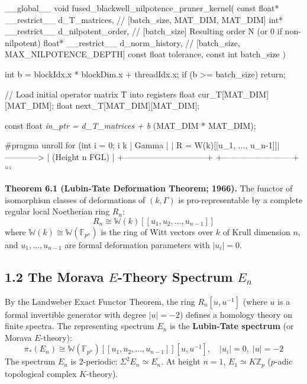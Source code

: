 \documentclass[11pt,twoside,openright]{amsbook}
\begin{document}
__global__ void fused_blackwell_nilpotence_pruner_kernel(
    const float* __restrict__ d_T_matrices,   // [batch_size, MAT_DIM, MAT_DIM]
    int* __restrict__ d_nilpotent_order,      // [batch_size] Resulting order N (or 0 if non-nilpotent)
    float* __restrict__ d_norm_history,       // [batch_size, MAX_NILPOTENCE_DEPTH]
    const float tolerance,
    const int batch_size
) {
    int b = blockIdx.x * blockDim.x + threadIdx.x;
    if (b >= batch_size) return;

    // Load initial operator matrix T into registers
    float cur_T[MAT_DIM][MAT_DIM];
    float next_T[MAT_DIM][MAT_DIM];

    const float\textit{ in_ptr = d_T_matrices + b } (MAT_DIM * MAT_DIM);

    #pragma unroll
    for (int i = 0; i  k |          Gamma           |
   |  R = W(k)[[u_1, ..., u_{n-1}]]| ------------> |      (Height n FGL)      |
   +------------------------------+               +--------------------------+
```

\textbf{Theorem 6.1 (Lubin-Tate Deformation Theorem; 1966).} The functor of isomorphism classes of deformations of $(k, \Gamma)$ is pro-representable by a complete regular local Noetherian ring $R_n$:
$$R_n \cong \mathbb{W}(k)[[u_1, u_2, \dots, u_{n-1}]]$$
where $\mathbb{W}(k) \cong \mathbb{W}(\mathbb{F}_{p^n})$ is the ring of Witt vectors over $k$ of Krull dimension $n$, and $u_1, \dots, u_{n-1}$ are formal deformation parameters with $|u_i| = 0$.

\subsection{1.2 The Morava $E$-Theory Spectrum $E_n$}
By the Landweber Exact Functor Theorem, the ring $R_n[u, u^{-1}]$ (where $u$ is a formal invertible generator with degree $|u| = -2$) defines a homology theory on finite spectra. The representing spectrum $E_n$ is the \textbf{Lubin-Tate spectrum} (or Morava $E$-theory):
$$\pi_*(E_n) \cong \mathbb{W}(\mathbb{F}_{p^n})[[u_1, u_2, \dots, u_{n-1}]][u, u^{-1}], \quad |u_i| = 0, \; |u| = -2$$
The spectrum $E_n$ is 2-periodic: $\Sigma^2 E_n \simeq E_n$. At height $n=1$, $E_1 \simeq K\mathbb{Z}_p$ ($p$-adic topological complex $K$-theory).

}
\end{document}
